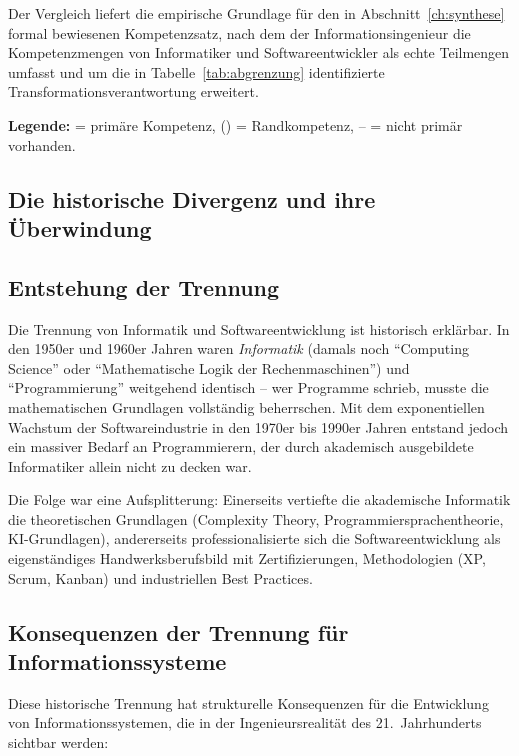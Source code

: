 ﻿\documentclass[a4paper,12pt]{report}
\theoremstyle{definition}
\begin{document}
Der Vergleich liefert die empirische Grundlage für den in Abschnitt~\ref{ch:synthese} formal bewiesenen Kompetenzsatz, nach dem der Informationsingenieur die Kompetenzmengen von Informatiker und Softwareentwickler als echte Teilmengen umfasst und um die in Tabelle~\ref{tab:abgrenzung} identifizierte Transformationsverantwortung erweitert.

\noindent
\textbf{Legende:} \checkmark = primäre Kompetenz, (\checkmark) = Randkompetenz, -- = nicht primär vorhanden.

\subsection{Die historische Divergenz und ihre Überwindung}

\subsection{Entstehung der Trennung}

Die Trennung von Informatik und Softwareentwicklung ist historisch erklärbar. In den
1950er und 1960er Jahren waren \emph{Informatik} (damals noch \enquote{Computing Science}
oder \enquote{Mathematische Logik der Rechenmaschinen}) und \enquote{Programmierung}
weitgehend identisch -- wer Programme schrieb, musste die mathematischen Grundlagen
vollständig beherrschen. Mit dem exponentiellen Wachstum der Softwareindustrie in
den 1970er bis 1990er Jahren entstand jedoch ein massiver Bedarf an Programmierern,
der durch akademisch ausgebildete Informatiker allein nicht zu decken war.

Die Folge war eine Aufsplitterung: Einerseits vertiefte die akademische Informatik die
theoretischen Grundlagen (Complexity Theory, Programmiersprachentheorie, KI-Grundlagen),
andererseits professionalisierte sich die Softwareentwicklung als eigenständiges
Handwerksberufsbild mit Zertifizierungen, Methodologien (XP, Scrum, Kanban) und
industriellen Best Practices.

\subsection{Konsequenzen der Trennung für Informationssysteme}

Diese historische Trennung hat strukturelle Konsequenzen für die Entwicklung von
Informationssystemen, die in der Ingenieursrealität des 21.~Jahrhunderts sichtbar werden:
\end{document}
